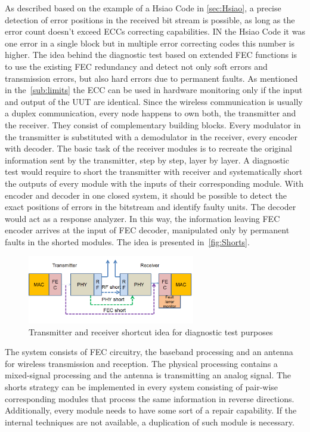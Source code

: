 As described based on the example of a Hsiao Code in \autoref{sec:Hsiao}, a precise detection of error positions in the received bit stream is possible, as long as the error count doesn't exceed ECCs correcting capabilities. IN the Hsiao Code it was one error in a single block but in multiple error correcting codes this number is higher. The idea behind the diagnostic test based on extended FEC functions is to use the existing FEC redundancy and detect not only soft errors and transmission errors, but also hard errors due to permanent faults. As mentioned in the~\autoref{sub:limits} the ECC can be used in hardware monitoring only if the input and output of the UUT are identical. Since the wireless communication is usually a duplex communication, every node happens to own both, the transmitter and the receiver. They consist of complementary building blocks. Every modulator in the transmitter is substituted with a demodulator in the receiver, every encoder with decoder. The basic task of the receiver modules is to recreate the original information sent by the transmitter, step by step, layer by layer. A diagnostic test would require to short the transmitter with receiver and systematically short the outputs of every module with the inputs of their corresponding module. With encoder and decoder in one closed system, it should be possible to detect the exact positions of errors in the bitstream and identify faulty units. The decoder would act as a response analyzer. In this way, the information leaving FEC encoder arrives at the input of FEC decoder, manipulated only by permanent faults in the shorted modules. The idea is presented in~\autoref{fig:Shorts}. 

\begin{figure}[h]
\centering
\includegraphics[width=0.65\textwidth]{figures/Shorts.png}
\caption{Transmitter and receiver shortcut idea for diagnostic test purposes}
\label{fig:Shorts}
\end{figure}

The system consists of FEC circuitry, the baseband processing and an antenna for wireless transmission and reception. The physical processing contains a mixed-signal processing and the antenna is transmitting an analog signal. The shorts strategy can be implemented in every system consisting of pair-wise corresponding modules that process the same information in reverse directions. Additionally, every module needs to have some sort of a repair capability. If the internal techniques are not available, a duplication of such module is necessary.

